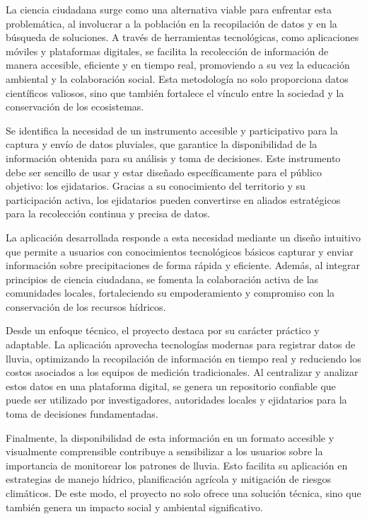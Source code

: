 La ciencia ciudadana surge como una alternativa viable para enfrentar esta problemática, al involucrar a la población en la recopilación de datos y en la búsqueda de soluciones. A través de herramientas tecnológicas, como aplicaciones móviles y plataformas digitales, se facilita la recolección de información de manera accesible, eficiente y en tiempo real, promoviendo a su vez la educación ambiental y la colaboración social. Esta metodología no solo proporciona datos científicos valiosos, sino que también fortalece el vínculo entre la sociedad y la conservación de los ecosistemas.

Se identifica la necesidad de un instrumento accesible y participativo para la captura y envío de datos pluviales, que garantice la disponibilidad de la información obtenida para su análisis y toma de decisiones. Este instrumento debe ser sencillo de usar y estar diseñado específicamente para el público objetivo: los ejidatarios. Gracias a su conocimiento del territorio y su participación activa, los ejidatarios pueden convertirse en aliados estratégicos para la recolección continua y precisa de datos.

La aplicación desarrollada responde a esta necesidad mediante un diseño intuitivo que permite a usuarios con conocimientos tecnológicos básicos capturar y enviar información sobre precipitaciones de forma rápida y eficiente. Además, al integrar principios de ciencia ciudadana, se fomenta la colaboración activa de las comunidades locales, fortaleciendo su empoderamiento y compromiso con la conservación de los recursos hídricos.

Desde un enfoque técnico, el proyecto destaca por su carácter práctico y adaptable. La aplicación aprovecha tecnologías modernas para registrar datos de lluvia, optimizando la recopilación de información en tiempo real y reduciendo los costos asociados a los equipos de medición tradicionales. Al centralizar y analizar estos datos en una plataforma digital, se genera un repositorio confiable que puede ser utilizado por investigadores, autoridades locales y ejidatarios para la toma de decisiones fundamentadas.

Finalmente, la disponibilidad de esta información en un formato accesible y visualmente comprensible contribuye a sensibilizar a los usuarios sobre la importancia de monitorear los patrones de lluvia. Esto facilita su aplicación en estrategias de manejo hídrico, planificación agrícola y mitigación de riesgos climáticos. De este modo, el proyecto no solo ofrece una solución técnica, sino que también genera un impacto social y ambiental significativo.

